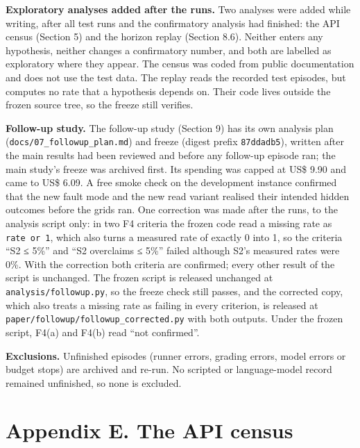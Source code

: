 \documentclass[
  10pt,
]{article}
\begin{document}
\textbf{Exploratory analyses added after the runs.} Two analyses were
added while writing, after all test runs and the confirmatory analysis
had finished: the API census (Section 5) and the horizon replay (Section
8.6). Neither enters any hypothesis, neither changes a confirmatory
number, and both are labelled as exploratory where they appear. The
census was coded from public documentation and does not use the test
data. The replay reads the recorded test episodes, but computes no rate
that a hypothesis depends on. Their code lives outside the frozen source
tree, so the freeze still verifies.

\textbf{Follow-up study.} The follow-up study (Section 9) has its own
analysis plan (\texttt{docs/07\_followup\_plan.md}) and freeze (digest
prefix \texttt{87ddadb5}), written after the main results had been
reviewed and before any follow-up episode ran; the main study's freeze
was archived first. Its spending was capped at US\$ 9.90 and came to
US\$ 6.09. A free smoke check on the development instance confirmed that
the new fault mode and the new read variant realised their intended
hidden outcomes before the grids ran. One correction was made after the
runs, to the analysis script only: in two F4 criteria the frozen code
read a missing rate as \texttt{rate\ or\ 1}, which also turns a measured
rate of exactly 0 into 1, so the criteria ``S2 ≤ 5\%'' and ``S2
overclaims ≤ 5\%'' failed although S2's measured rates were 0\%. With
the correction both criteria are confirmed; every other result of the
script is unchanged. The frozen script is released unchanged at
\texttt{analysis/followup.py}, so the freeze check still passes, and the
corrected copy, which also treats a missing rate as failing in every
criterion, is released at \texttt{paper/followup/followup\_corrected.py}
with both outputs. Under the frozen script, F4(a) and F4(b) read ``not
confirmed''.

\textbf{Exclusions.} Unfinished episodes (runner errors, grading errors,
model errors or budget stops) are archived and re-run. No scripted or
language-model record remained unfinished, so none is excluded.

\hypertarget{appendix-e.-the-api-census}{%
\section*{Appendix E. The API census}\label{appendix-e.-the-api-census}}
\end{document}
